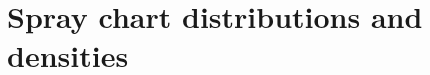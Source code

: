 \documentclass[12pt]{article}
\begin{document}




\section{Spray chart distributions and densities}
\end{document}
